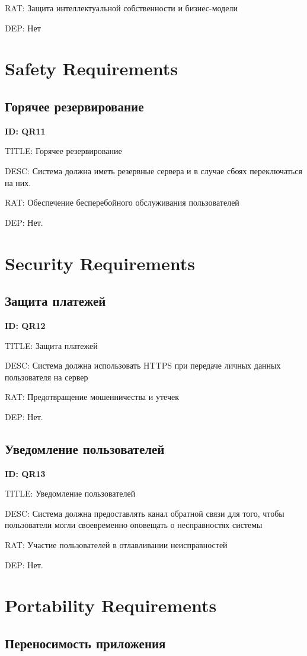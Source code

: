 \documentclass{scrreprt}
\begin{document}
RAT: Защита интеллектуальной собственности и бизнес-модели

DEP: Нет
\section{Safety Requirements}
\subsection{Горячее резервирование}
\textbf{ID: QR11}

TITLE: Горячее резервирование

DESC:
Система должна иметь резервные сервера и в случае сбоях переключаться на них.

RAT: Обеспечение бесперебойного обслуживания пользователей

DEP: Нет.
\section{Security Requirements}
\subsection{Защита платежей}
\textbf{ID: QR12}

TITLE: Защита платежей

DESC:
Система должна использовать
HTTPS при передаче личных данных пользователя на сервер

RAT: Предотвращение мошенничества и утечек

DEP: Нет.
\subsection{Уведомление пользователей}
\textbf{ID: QR13}

TITLE: Уведомление пользователей

DESC:
Система должна предоставлять канал обратной связи для того, чтобы пользователи могли своевременно оповещать о несправностях системы

RAT: Участие пользователей в отлавливании неисправностей

DEP: Нет.
\section{Portability Requirements}
\subsection{Переносимость приложения}
\end{document}
